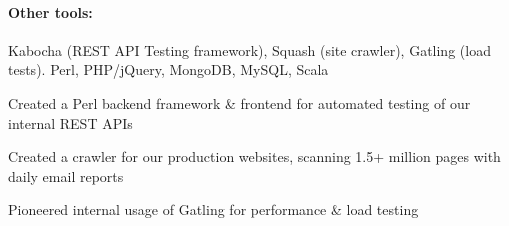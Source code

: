 \begin{position}
  \paragraph{Other tools:} Kabocha (REST API Testing framework), Squash (site crawler), Gatling (load tests). Perl, PHP/jQuery, MongoDB, MySQL, Scala
  \begin{myitem}
  \item Created a Perl backend framework \& frontend for automated testing of our internal REST APIs
  \item Created a crawler for our production websites, scanning 1.5+ million pages with daily email reports
  \item Pioneered internal usage of Gatling for performance \& load testing
  \end{myitem}
\end{position}
%
